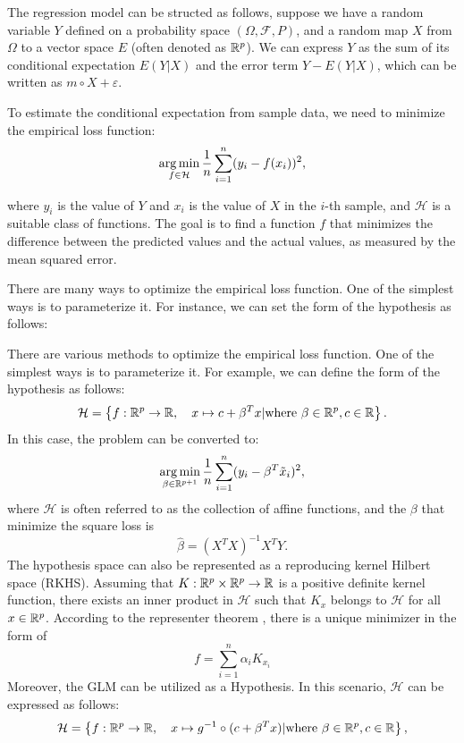 The regression model can be structed as follows, suppose we have a random variable $Y$ defined on a probability space $(\Omega, \mathcal{F}, P)$, and a random map $X$ from $\Omega$ to a vector space $E$ (often denoted as $\mathbb{R}^p$). We can express $Y$ as the sum of its conditional expectation $E(Y|X)$ and the error term $Y-E(Y|X)$, which can be written as $m\circ X + \varepsilon$.

To estimate the conditional expectation from sample data, we need to minimize the empirical loss function:
$$
\mathop{\arg\min}_{f \in \mathcal{H}} \frac{1}{n} \sum_{i=1}^n (y_i - f(x_i))^2,
$$

where $y_i$ is the value of $Y$ and $x_i$ is the value of $X$ in the $i$-th sample, and $\mathcal{H}$ is a suitable class of functions. The goal is to find a function $f$ that minimizes the difference between the predicted values and the actual values, as measured by the mean squared error.


There are many ways to optimize the empirical loss function. One of the simplest ways is to parameterize it. For instance, we can set the form of the hypothesis as follows:

There are various methods to optimize the empirical loss function. One of the simplest ways is to parameterize it. For example, we can define the form of the hypothesis as follows:
\begin{equation}
\mathcal{H} = \left\{f: \mathbb{R}^p \to \mathbb{R}, \quad x \mapsto c+ \beta^T x| \text{where}\ \beta \in \mathbb{R}^p, c \in \mathbb{R} \right\}.	
\end{equation}
In this case, the problem can be converted to:
$$
\mathop{\arg\min}_{\beta \in \mathbb{R}^{p+1}} \frac{1}{n} \sum_{i=1}^n (y_i - \beta^T \tilde x_i)^2,
$$
where $\mathcal{H}$ is often referred to as the collection of affine functions, and the $\beta$ that minimize the square loss is
$$
\hat \beta = (X^T X)^{-1} X^T Y.
$$
The hypothesis space can also be represented as a reproducing kernel Hilbert space (RKHS). Assuming that $K: \mathbb{R}^p \times \mathbb{R}^p \to \mathbb{R}$ is a positive definite kernel function, there exists an inner product in $\mathcal{H}$ such that $K_x$ belongs to $\mathcal{H}$ for all $x\in \mathbb{R}^p$. According to the representer theorem \cite{scholkopf2001generalized}, there is a unique minimizer in the form of
$$
f = \sum_{i=1}^n \alpha_i K_{x_i}
$$
Moreover, the GLM can be utilized as a Hypothesis. In this scenario, $\mathcal{H}$ can be expressed as follows:
\begin{equation}
\mathcal{H} = \left\{f: \mathbb{R}^p \to \mathbb{R}, \quad x \mapsto g^{-1} \circ(c+ \beta^T x)| \text{where}\ \beta \in \mathbb{R}^p, c \in \mathbb{R} \right\},	
\end{equation}


